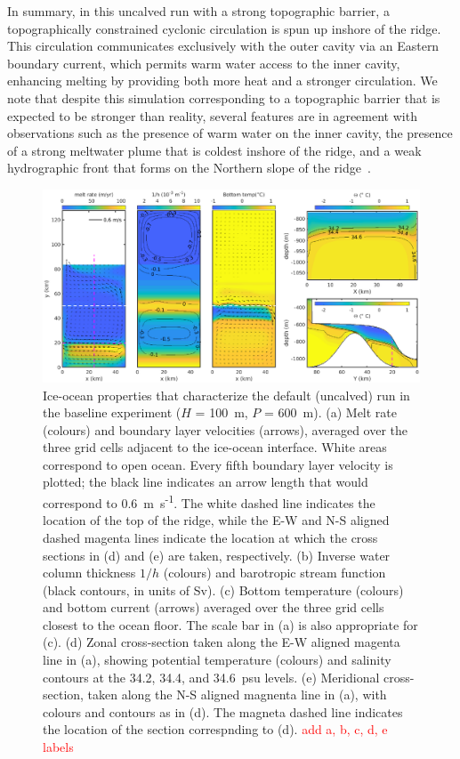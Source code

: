 \documentclass[draft]{agujournal2019}
\newcommand{\red}[1]{\textcolor{red}{#1}}
\begin{document}
In summary, in this uncalved run with a strong topographic barrier, a topographically constrained cyclonic circulation is spun up inshore of the ridge. This circulation communicates exclusively with the outer cavity via an Eastern boundary current, which permits warm water access to the inner cavity, enhancing melting by providing both more heat and a stronger circulation. We note that despite this simulation corresponding to a topographic barrier that is expected to be stronger than reality, several features are in agreement with observations such as the presence of warm water on the inner cavity, the presence of a strong meltwater plume that is coldest inshore of the ridge, and a weak hydrographic front that forms on the Northern slope of the ridge~\cite{Jenkins2010NatureGeo}.

\begin{figure}
    \centering
    \includegraphics[width = \textwidth]{../make_figures/plots/figure3.eps}
    \caption{Ice-ocean properties that characterize the default (uncalved) run in the baseline experiment ($H$ = 100~m, $P$ = 600~m). (a) Melt rate (colours) and boundary layer velocities (arrows), averaged over the three grid cells adjacent to the ice-ocean interface. White areas correspond to open ocean. Every fifth boundary layer velocity is plotted; the black line indicates an arrow length that would correspond to 0.6~m~s\textsuperscript{-1}. The white dashed line indicates the location of the top of the ridge, while the E-W and N-S aligned dashed magenta lines indicate the location at which the cross sections in (d) and (e) are taken, respectively. (b) Inverse water column thickness $1/h$ (colours) and barotropic stream function (black contours, in units of Sv). (c) Bottom temperature (colours) and bottom current (arrows) averaged over the three grid cells closest to the ocean floor. The scale bar in (a) is also appropriate for (c). (d) Zonal cross-section taken along the E-W aligned magenta line in (a), showing potential temperature (colours) and salinity contours at the 34.2, 34.4, and 34.6~psu levels. (e) Meridional cross-section, taken along the N-S aligned magnenta line in (a), with colours and contours as in (d). The magneta dashed line indicates the location of the section correspnding to (d). \red{add a, b, c, d, e labels}}
    \label{fig:figure3}
\end{figure}
\end{document}
